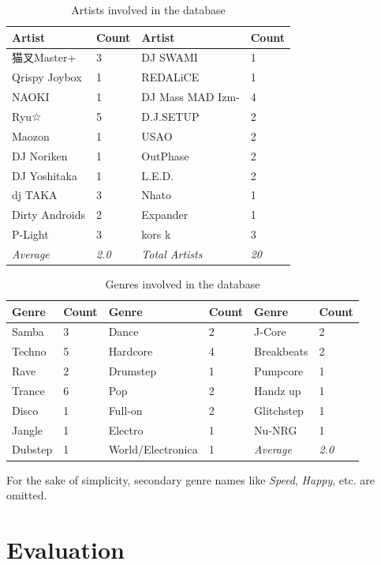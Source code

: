 \documentclass{report}
\begin{document}
\begin{table}[H]
\centering

\label{my-label}
\begin{tabular}{llll}
\hline
\textbf{Artist} & \textbf{Count} & \textbf{Artist} & \textbf{Count} \\ \hline
猫叉Master+ & 3 & DJ SWAMI & 1 \\
Qrispy Joybox & 1 & REDALiCE & 1 \\
NAOKI & 1 & DJ Mass MAD Izm- & 4 \\
Ryu☆ & 5 & D.J.SETUP & 2 \\
Maozon & 1 & USAO & 2 \\
DJ Noriken & 1 & OutPhase & 2 \\
DJ Yoshitaka & 1 & L.E.D. & 2 \\
dj TAKA & 3 & Nhato & 1 \\
Dirty Androids & 2 & Expander & 1 \\
P-Light & 3 & kors k & 3 \\ \hline
\textit{Average} & \textit{2.0} & \textit{Total Artists} & \textit{20}
\end{tabular}
\caption{Artists involved in the database}
\end{table}

\begin{table}[H]
\centering
\begin{tabular}{llllll}
\hline
\textbf{Genre} & \textbf{Count} & \textbf{Genre} & \textbf{Count} & \textbf{Genre} & \textbf{Count} \\ \hline
Samba & 3 & Dance & 2 & J-Core & 2 \\
Techno & 5 & Hardcore & 4 & Breakbeats & 2 \\
Rave & 2 & Drumstep & 1 & Pumpcore & 1 \\
Trance & 6 & Pop & 2 & Handz up & 1 \\
Disco & 1 & Full-on & 2 & Glitchstep & 1 \\
Jangle & 1 & Electro & 1 & Nu-NRG & 1 \\ \cline{5-6} 
Dubstep & 1 & World/Electronica & 1 & \textit{Average} & \textit{2.0}
\end{tabular}
\caption{Genres involved in the database}
\end{table}

For the sake of simplicity, secondary genre names like \textit{Speed}, \textit{Happy}, etc. are omitted.

\section{Evaluation}
\end{document}
